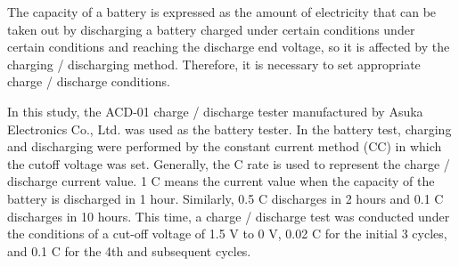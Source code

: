 The capacity of a battery is expressed as the amount of electricity that can be taken out by discharging a battery charged under certain conditions under certain conditions and reaching the discharge end voltage, so it is affected by the charging / discharging method. Therefore, it is necessary to set appropriate charge / discharge conditions.

In this study, the ACD-01 charge / discharge tester manufactured by Asuka Electronics Co., Ltd. was used as the battery tester. In the battery test, charging and discharging were performed by the constant current method (CC) in which the cutoff voltage was set. Generally, the C rate is used to represent the charge / discharge current value. 1 C means the current value when the capacity of the battery is discharged in 1 hour. Similarly, 0.5 C discharges in 2 hours and 0.1 C discharges in 10 hours. This time, a charge / discharge test was conducted under the conditions of a cut-off voltage of 1.5 V to 0 V, 0.02 C for the initial 3 cycles, and 0.1 C for the 4th and subsequent cycles.

